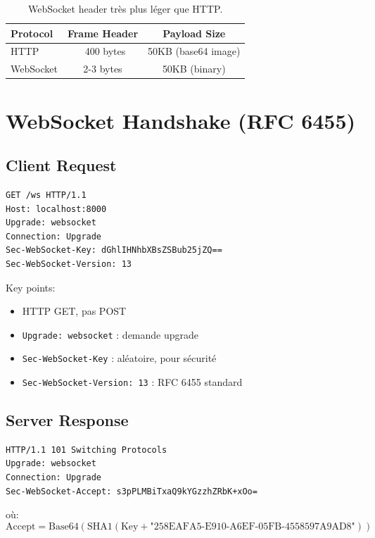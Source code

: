 \documentclass[12pt,a4paper,oneside]{report}
\begin{document}
\begin{table}[H]
\centering
\begin{tabular}{|l|c|c|}
\hline
Protocol & Frame Header & Payload Size \\
\hline
HTTP & ~400 bytes & 50KB (base64 image) \\
WebSocket & 2-3 bytes & 50KB (binary) \\
\hline
\end{tabular}
\caption{WebSocket header très plus léger que HTTP.}
\label{tab:websocket_overhead}
\end{table}

\section{WebSocket Handshake (RFC 6455)}

\subsection{Client Request}

\begin{verbatim}
GET /ws HTTP/1.1
Host: localhost:8000
Upgrade: websocket
Connection: Upgrade
Sec-WebSocket-Key: dGhlIHNhbXBsZSBub25jZQ==
Sec-WebSocket-Version: 13
\end{verbatim}

Key points:
\begin{itemize}
    \item HTTP GET, pas POST
    \item \texttt{Upgrade: websocket} : demande upgrade
    \item \texttt{Sec-WebSocket-Key} : aléatoire, pour sécurité
    \item \texttt{Sec-WebSocket-Version: 13} : RFC 6455 standard
\end{itemize}

\subsection{Server Response}

\begin{verbatim}
HTTP/1.1 101 Switching Protocols
Upgrade: websocket
Connection: Upgrade
Sec-WebSocket-Accept: s3pPLMBiTxaQ9kYGzzhZRbK+xOo=
\end{verbatim}

où:
\begin{equation}
\text{Accept} = \text{Base64}(\text{SHA1}(
\text{Key} + \text{"258EAFA5-E910-A6EF-05FB-4558597A9AD8"}))
\end{equation}
\end{document}
